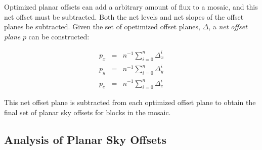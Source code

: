 \documentclass[iop]{emulateapj}
\begin{document}
Optimized planar offsets can add a arbitrary amount of flux to a mosaic, and this net offset must be subtracted. Both the net levels and net slopes of the offset planes be subtracted. Given the set of opetimized offset planes, $\Delta$, a \emph{net offset plane} $p$ can be constructed:

\begin{eqnarray}
	p_x & = & n^{-1} \sum_{i=0}^n \Delta_x^i \\
	p_y & = & n^{-1} \sum_{i=0}^n \Delta_y^i \\
	p_c & = & n^{-1} \sum_{i=0}^n \Delta_c^i
\end{eqnarray}

\noindent This net offset plane is subtracted from each optimized offset plane to obtain the final set of planar sky offsets for blocks in the mosaic.

\subsection{Analysis of Planar Sky Offsets}


\end{document}
